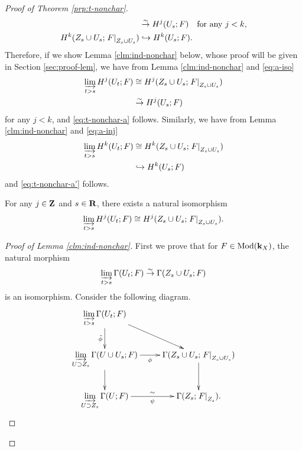 \begin{proof}[{Proof of Theorem \ref{prp:t-nonchar}}]
\begin{align}
    &\simar
    H^{j}(U_{s};F)\quad
    \text{for any \(j< k\),}\\
    \label{eq:a-inj}
    H^{k}(Z_{s}\cup U_{s};\mres[F]{Z_{s}\cup U_{s}})
    &\hookrightarrow
    H^{k}(U_{s};F).
  \end{align}
  Therefore, if we show Lemma \ref{clm:ind-nonchar} below, 
  whose proof will be given in Section \ref{sec:proof-lem},
  we have from Lemma \ref{clm:ind-nonchar} and \eqref{eq:a-iso}
  \begin{align*}
    \indlim[t>s]H^{j}(U_t;F)
    &\cong 
    H^{j}(Z_{s}\cup U_{s};\mres[F]{Z_{s}\cup U_{s}})\\
    &\simar
    H^{j}(U_s;F)
  \end{align*}
  for any \(j<k\), and \ref{eq:t-nonchar-a} follows. 
  Similarly, 
  we have from Lemma \ref{clm:ind-nonchar} and \eqref{eq:a-inj}
  \begin{align*}
    \indlim[t>s]H^{k}(U_t;F)
    &\cong 
    H^{k}(Z_{s}\cup U_{s};\mres[F]{Z_{s}\cup U_{s}})\\
    &\hookrightarrow
    H^{k}(U_s;F)
  \end{align*}
  and \ref{eq:t-nonchar-a'} follows. 
  \begin{Lemma+}\label{clm:ind-nonchar}
    For any \(j\in\zz\) and \(s\in\rr\), there exists a natural isomorphism 
    \[
      \indlim[t>s]H^{j}(U_t;F)
      \cong 
      H^{j}(Z_{s}\cup U_{s};\mres[F]{Z_{s}\cup U_{s}}).
    \]
  \end{Lemma+}
    \begin{proof}[Proof of Lemma \ref{clm:ind-nonchar}]
    First we prove that 
    for \(F\in \Mod(\kk_X)\), 
    the natural morphism
    \begin{equation}\label{eq:qis-claim}
      \indlim[t>s]\Gamma(U_t;F)
      \simar 
      \Gamma(Z_{s}\cup U_{s};F)
    \end{equation}
    is an isomorphism. 
    Consider the following diagram. 
    \[\vcenter{\xymatrix{
      \indlim[t>s]\Gamma(U_t;F)
      \ar[rd]
      \ar[d]_-{\tilde{\phi}}
      &
      \\
      \indlim[U\supset Z_{s}]
      \Gamma(U\cup U_{s};F)
      \ar[d]
      \ar[r]_-{\phi}
      &
      \Gamma(Z_{s}\cup U_{s};\mres[F]{Z_{s}\cup U_{s}})
      \ar[d]
      \\
      \indlim[U\supset Z_{s}]
      \Gamma(U;F)
      \ar[r]_-{\psi}^-{\sim}
      &
      \Gamma(Z_{s};\mres[F]{Z_{s}}).}
    }
    \] 
    

\end{proof}
\end{proof}
